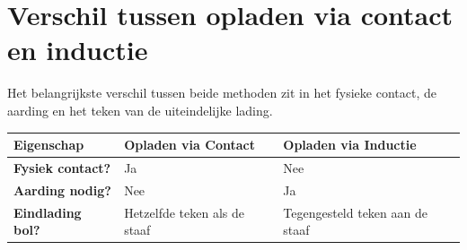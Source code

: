 \documentclass{ximera}
\begin{document}
\section{Verschil tussen opladen via contact en inductie}
Het belangrijkste verschil tussen beide methoden zit in het fysieke contact, de aarding en het teken van de uiteindelijke lading.

\begin{center}
    \begin{tabular}{ |p{4cm}|p{5cm}|p{5cm}| } 
    \hline
    \textbf{Eigenschap} & \textbf{Opladen via Contact} & \textbf{Opladen via Inductie} \\
    \hline
    \textbf{Fysiek contact?} & Ja & Nee \\
    \hline
    \textbf{Aarding nodig?} & Nee & Ja \\
    \hline
    \textbf{Eindlading bol?} & Hetzelfde teken als de staaf & Tegengesteld teken aan de staaf \\
    \hline
    \end{tabular}
\end{center}
\end{document}
